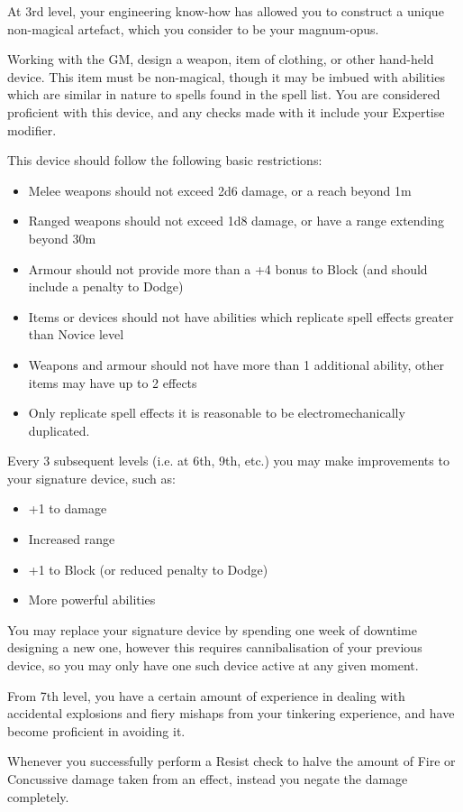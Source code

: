 {
	At 3rd level, your engineering know-how has allowed you to construct a unique non-magical artefact, which you consider to be your magnum-opus. 
	
	Working with the GM, design a weapon, item of clothing, or other hand-held device. This item must be non-magical, though it may be imbued with abilities which are similar in nature to spells found in the spell list. You are considered proficient with this device, and any checks made with it include your Expertise modifier. 
	
	This device should follow the following basic restrictions:
	\begin{itemize}
		\item Melee weapons should not exceed 2d6 damage, or a reach beyond 1m
		\item Ranged weapons should not exceed 1d8 damage, or have a range extending beyond 30m
		\item Armour should not provide more than a +4 bonus to Block (and should include a penalty to Dodge)
		\item Items or devices should not have abilities which replicate spell effects greater than Novice level
		\item Weapons and armour should not have more than 1 additional ability, other items may have up to 2 effects
		\item Only replicate spell effects it is reasonable to be electromechanically duplicated.
	\end{itemize}
	
	Every 3 subsequent levels (i.e. at 6th, 9th, etc.) you may make improvements to your signature device, such as:
	\begin{itemize}
		\item +1 to damage
		\item Increased range
		\item +1 to Block (or reduced penalty to Dodge)
		\item More powerful abilities
	\end{itemize}
	
	You may replace your signature device by spending one week of downtime designing a new one, however this requires cannibalisation of your previous device, so you may only have one such device active at any given moment.
}

{
	From 7th level, you have a certain amount of experience in dealing with accidental explosions and fiery mishaps from your tinkering experience, and have become proficient in avoiding it.
	
	Whenever you successfully perform a Resist check to halve the amount of Fire or Concussive damage taken from an effect, instead you negate the damage completely.
}

